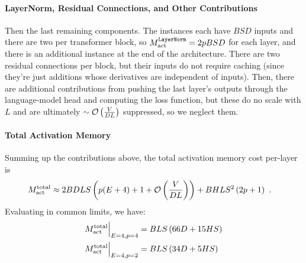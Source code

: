\documentclass[11pt]{article}
\begin{document}
\paragraph{LayerNorm, Residual Connections, and Other Contributions}

Then the last remaining components. The  instances each have $ BSD $ inputs and
there are two per transformer block, so $ M _{ {\rm  act}  } ^\texttt{LayerNorm} = 2pBSD $ for each
layer, and there is an additional instance at the end of the architecture. There are two residual
connections per block, but their inputs do not require caching (since they're just additions whose
derivatives are independent of inputs). Then, there are additional contributions from pushing the
last layer's outputs through the language-model head and computing the loss function, but these do
no scale with $ L $ and are ultimately $ \sim \mathcal{O} \left( \frac{ V }{ DL } \right)  $ suppressed,
so we neglect them.





\paragraph{Total Activation Memory}


Summing up the contributions above, the total activation memory cost per-layer is
\begin{align}
    M _{ {\rm act}  } ^{ {\rm  total}  } & \approx  2BDLS   \left ( p(E+4) + 1 + \mathcal{O} \left( \frac{
    V}{ DL } \right)  \right )
    + BHLS ^{ 2 } \left ( 2p+1\right ) \label{eq_act_mem_total_no_sharding}\ .
\end{align}
Evaluating in common limits, we have:
\begin{align}
    M _{ {\rm act}  } ^{ {\rm  total}  } \Big| _{ E=4, p=4 } &=BLS \left ( 66 D+15HS  \right ) \nonumber\\
    M _{ {\rm act}  } ^{ {\rm  total}  } \Big| _{ E=4, p=2 } &=BLS \left ( 34 D+5HS  \right )
\end{align}
\end{document}
